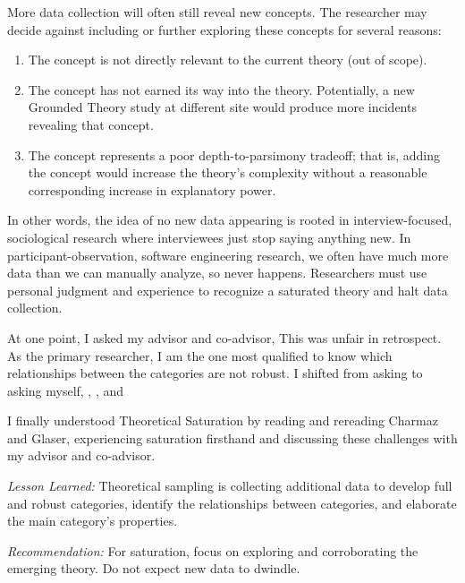 More data collection will often still reveal new concepts. The researcher may decide against including or further exploring these concepts for several reasons:
\begin{enumerate}
  \item The concept is not directly relevant to the current theory (out of scope).
  \item The concept has not earned its way into the theory. Potentially, a new Grounded Theory study at different site would produce more incidents revealing that concept. 
  \item The concept represents a poor depth-to-parsimony tradeoff; that is, adding the concept would increase the theory's complexity without a reasonable corresponding increase in explanatory power. 
\end{enumerate}

In other words, the idea of no new data appearing is rooted in interview-focused, sociological research where interviewees just stop saying anything new. In participant-observation, software engineering research, we often have much more data than we can manually analyze, so  never happens. Researchers must use personal judgment and experience to recognize a saturated theory and halt data collection.   

At one point, I asked my advisor and co-advisor,  This was unfair in retrospect. As the primary researcher, I am the one most qualified to know which relationships between the categories are not robust. I shifted from asking  to asking myself, , , and 

I finally understood Theoretical Saturation by reading and rereading Charmaz and Glaser, experiencing saturation firsthand and discussing these challenges with my advisor and co-advisor. 

\textit{Lesson Learned:} Theoretical sampling is collecting additional data to develop full and robust categories, identify the relationships between categories, and elaborate the main category's properties.

\textit{Recommendation:} For saturation, focus on exploring and corroborating the emerging theory. Do not expect new data to dwindle.  
